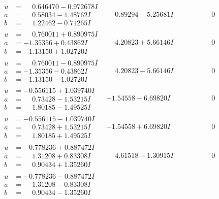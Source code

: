 \documentclass[1p]{elsarticle_modified}
\theoremstyle{definition}
\begin{document}
$$\begin{array}{c|c|c}
\begin{aligned}
u &= \phantom{-}0.646470 - 0.972678 I \\
a &= \phantom{-}0.58034 - 1.48762 I \\
b &= \phantom{-}1.22462 - 0.71265 I\end{aligned}
 & \phantom{-}0.89294 - 5.25681 I & \phantom{-0.000000 } 0 \\ \hline\begin{aligned}
u &= \phantom{-}0.760011 + 0.890975 I \\
a &= -1.35356 + 0.43862 I \\
b &= -1.13150 + 1.02720 I\end{aligned}
 & \phantom{-}4.20823 + 5.66146 I & \phantom{-0.000000 } 0 \\ \hline\begin{aligned}
u &= \phantom{-}0.760011 - 0.890975 I \\
a &= -1.35356 - 0.43862 I \\
b &= -1.13150 - 1.02720 I\end{aligned}
 & \phantom{-}4.20823 - 5.66146 I & \phantom{-0.000000 } 0 \\ \hline\begin{aligned}
u &= -0.556115 + 1.039740 I \\
a &= \phantom{-}0.73428 - 1.53215 I \\
b &= \phantom{-}1.80185 - 1.49525 I\end{aligned}
 & -1.54558 - 6.69820 I & \phantom{-0.000000 } 0 \\ \hline\begin{aligned}
u &= -0.556115 - 1.039740 I \\
a &= \phantom{-}0.73428 + 1.53215 I \\
b &= \phantom{-}1.80185 + 1.49525 I\end{aligned}
 & -1.54558 + 6.69820 I & \phantom{-0.000000 } 0 \\ \hline\begin{aligned}
u &= -0.778236 + 0.887472 I \\
a &= \phantom{-}1.31208 + 0.83308 I \\
b &= \phantom{-}0.90434 + 1.35260 I\end{aligned}
 & \phantom{-}4.61518 - 1.30915 I & \phantom{-0.000000 } 0 \\ \hline\begin{aligned}
u &= -0.778236 - 0.887472 I \\
a &= \phantom{-}1.31208 - 0.83308 I \\
b &= \phantom{-}0.90434 - 1.35260 I\end{aligned}

\end{array}$$
\end{document}
